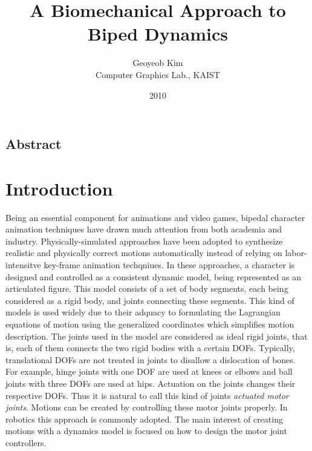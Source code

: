 \documentclass[a4paper,10pt]{article}
\begin{document}
\title{A Biomechanical Approach to Biped Dynamics}

\author{Geoyeob Kim\\
Computer Graphics Lab., KAIST
}
\date{2010}
\maketitle

\pagebreak

\setcounter{page}{1}
\subsection*{Abstract}
\pagebreak


\tableofcontents
\pagebreak


\listoffigures 	%
\pagebreak

\listoftables
\pagebreak

\setcounter{page}{1}

\section{Introduction}
Being an essential component for animations and video games,
bipedal character animation techniques have drawn much attention from
both academia and industry. Physically-simulated approaches have been
adopted to synthesize realistic and physically correct motions
automatically instead of relying on labor-intensitve key-frame animation
techqniues. In these approaches, a character is designed and controlled
as a consistent dynamic model, being represented as an articulated
figure. This model consists of a set of body segments, each being
considered as a rigid body, and joints connecting these segments.
This kind of models is used widely due to their adquacy to formulating
the Lagrangian equations of motion using the generalized coordinates
which simplifies motion description.
The joints used in the model are considered as ideal rigid joints,
that is, each of them connects the two rigid bodies with a certain DOFs.
Typically, translational DOFs are not treated in joints to disallow a dislocation of bones.
For example, hinge joints with one DOF are used at knees or elbows and
ball joints with three DOFs are used at hips. Actuation on the joints
changes their respective DOFs. Thus it is natural to call this kind of joints
\emph{actuated motor joints}. Motions can be created by
controlling these motor joints properly. In robotics this approach is
commonly adopted. The main interest of creating motions
with a dynamics model is focused on how to design the motor joint controllers.
\end{document}
